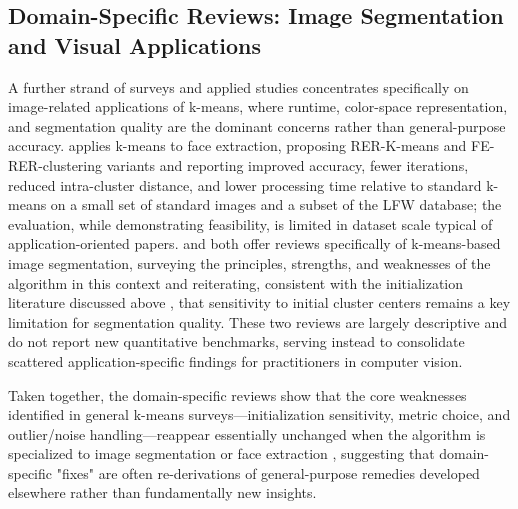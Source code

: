 \subsection{Domain-Specific Reviews: Image Segmentation and Visual Applications}
A further strand of surveys and applied studies concentrates specifically on image-related applications of k-means, where runtime, color-space representation, and segmentation quality are the dominant concerns rather than general-purpose accuracy. \cite{farhang2017face} applies k-means to face extraction, proposing RER-K-means and FE-RER-clustering variants and reporting improved accuracy, fewer iterations, reduced intra-cluster distance, and lower processing time relative to standard k-means on a small set of standard images and a subset of the LFW database; the evaluation, while demonstrating feasibility, is limited in dataset scale typical of application-oriented papers. \cite{sattarov2023unveiling} and \cite{mukherjee2025survey} both offer reviews specifically of k-means-based image segmentation, surveying the principles, strengths, and weaknesses of the algorithm in this context and reiterating, consistent with the initialization literature discussed above \cite{franti2019how,agha2012efficient,bhavani2022efficient}, that sensitivity to initial cluster centers remains a key limitation for segmentation quality. These two reviews are largely descriptive and do not report new quantitative benchmarks, serving instead to consolidate scattered application-specific findings for practitioners in computer vision.

Taken together, the domain-specific reviews show that the core weaknesses identified in general k-means surveys---initialization sensitivity, metric choice, and outlier/noise handling---reappear essentially unchanged when the algorithm is specialized to image segmentation or face extraction \cite{farhang2017face,sattarov2023unveiling,mukherjee2025survey}, suggesting that domain-specific "fixes" are often re-derivations of general-purpose remedies developed elsewhere \cite{agha2012efficient,shrifan2021adaptive,raeisi2022distance} rather than fundamentally new insights.

